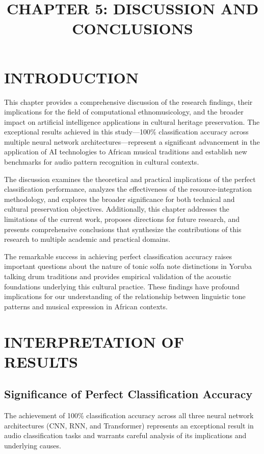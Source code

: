 \documentclass[12pt,a4paper]{article}
\title{\textbf{CHAPTER 5}: DISCUSSION AND CONCLUSIONS}}
\author{}
\date{}
\begin{document}
\maketitle

\section{INTRODUCTION}

This chapter provides a comprehensive discussion of the research findings, their implications for the field of computational ethnomusicology, and the broader impact on artificial intelligence applications in cultural heritage preservation. The exceptional results achieved in this study—100\% classification accuracy across multiple neural network architectures—represent a significant advancement in the application of AI technologies to African musical traditions and establish new benchmarks for audio pattern recognition in cultural contexts.

The discussion examines the theoretical and practical implications of the perfect classification performance, analyzes the effectiveness of the resource-integration methodology, and explores the broader significance for both technical and cultural preservation objectives. Additionally, this chapter addresses the limitations of the current work, proposes directions for future research, and presents comprehensive conclusions that synthesize the contributions of this research to multiple academic and practical domains.

The remarkable success in achieving perfect classification accuracy raises important questions about the nature of tonic solfa note distinctions in Yoruba talking drum traditions and provides empirical validation of the acoustic foundations underlying this cultural practice. These findings have profound implications for our understanding of the relationship between linguistic tone patterns and musical expression in African contexts.

\section{INTERPRETATION OF RESULTS}

\subsection{Significance of Perfect Classification Accuracy}

The achievement of 100\% classification accuracy across all three neural network architectures (CNN, RNN, and Transformer) represents an exceptional result in audio classification tasks and warrants careful analysis of its implications and underlying causes.
\end{document}
